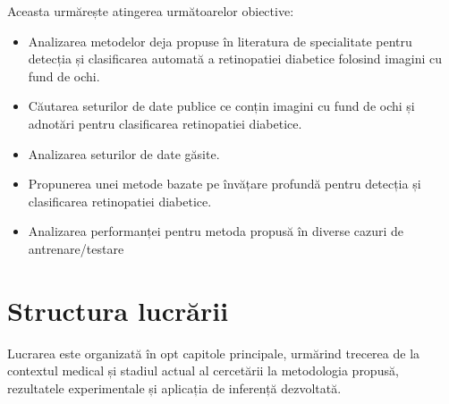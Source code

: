\documentclass[12pt, a4paper, oneside, romanian]{teza-upb}
\begin{document}
Aceasta urmărește atingerea următoarelor obiective:

\begin{itemize}
  \item Analizarea metodelor deja propuse în literatura de specialitate pentru detecția și clasificarea automată a retinopatiei diabetice folosind 
  imagini cu fund de ochi.

  \item Căutarea seturilor de date publice ce conțin imagini cu fund de ochi și adnotări pentru clasificarea retinopatiei diabetice.

  \item Analizarea seturilor de date găsite.

  \item Propunerea unei metode bazate pe învățare profundă pentru detecția și clasificarea retinopatiei diabetice.

  \item Analizarea performanței pentru metoda propusă în diverse cazuri de antrenare/testare
\end{itemize}

\section*{Structura lucrării}

Lucrarea este organizată în opt capitole principale, urmărind trecerea de la contextul medical și stadiul actual al cercetării la metodologia propusă, rezultatele experimentale și aplicația de inferență dezvoltată.
\end{document}
